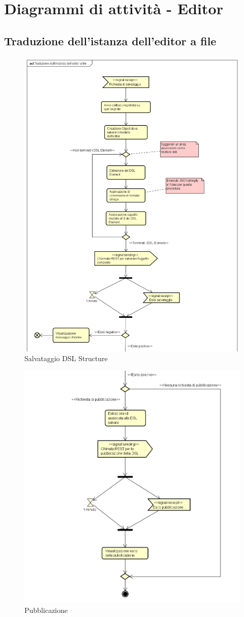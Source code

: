 \section{Diagrammi di attività - Editor}
    \subsection{Traduzione dell'istanza dell'editor a file}
    \begin{figure}[H]
      \centering
      \includegraphics[width=.8\textwidth]{res/img/salvataggio.png}
      \caption{Salvataggio DSL Structure}
      \label{fig:salvataggio}
    \end{figure}
    \begin{figure}[H]
      \centering
      \includegraphics[width=.7\textwidth]{res/img/pubblicazione.png}
      \caption{Pubblicazione}
      \label{fig:pubblicazione}
    \end{figure}
